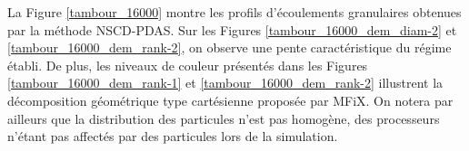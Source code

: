 La Figure \ref{tambour_16000} montre les profils d'écoulements granulaires obtenues par la méthode NSCD-PDAS. Sur les Figures \ref{tambour_16000_dem_diam-2} et \ref{tambour_16000_dem_rank-2}, on observe une pente caractéristique du régime établi. De plus, les niveaux de couleur présentés dans les Figures \ref{tambour_16000_dem_rank-1} et \ref{tambour_16000_dem_rank-2} illustrent la décomposition géométrique type cartésienne proposée par MFiX. On notera par ailleurs que la distribution des particules n'est pas homogène, des processeurs n'étant pas affectés par des particules lors de la simulation. 

\begin{figure}[h!]
\hspace{\fill}
   \\
\hspace{\fill}

\end{figure}
